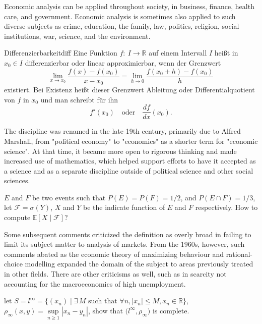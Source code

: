 \documentclass[titlestyle=hang,11pt]{elegantbook}
\begin{document}
Economic analysis can be applied throughout society, in business, finance, health care, and government. Economic analysis is sometimes also applied to such diverse subjects as crime, education, the family, law, politics, religion, social institutions, war, science, and the environment.

\begin{definition}{Differenzierbarkeit}{diff}
Eine Funktion $f:~I\to\mathbb{R}$ auf einem Intervall $I$ hei\ss{}t in $x_0\in I$ differenzierbar oder linear approximierbar, wenn der Grenzwert
   \begin{equation*}
      \lim\limits_{x\to x_0}\frac{f(x)-f(x_0)}{x-x_0}=
      \lim\limits_{h\to 0}\frac{f(x_0+h)-f(x_0)}{h}
   \end{equation*}
existiert. Bei Existenz hei\ss{}t dieser Grenzwert Ableitung oder Differentialquotient von $f$ in $x_0$ und man schreibt f\"{u}r ihn
   \begin{equation*}
      f'(x_0)\quad\text{oder}\quad\frac{df}{dx}(x_0).
   \end{equation*}
\end{definition}

The discipline was renamed in the late 19th century, primarily due to Alfred Marshall, from "political economy" to "economics" as a shorter term for "economic science". At that time, it became more open to rigorous thinking and made increased use of mathematics, which helped support efforts to have it accepted as a science and as a separate discipline outside of political science and other social sciences.

\begin{example}
$E$ and $F$ be two events such that $P(E)=
P(F)=1/2$, and $P(E\cap F)=1/3$, let $\mathscr{F}=\sigma(Y)$,  $X$ and $Y$ be the indicate function of $E$ and $F$ respectively. How to compute $\mathbb{E}[ X\mid \mathscr{F} ]$?
\end{example}

Some subsequent comments criticized the definition as overly broad in failing to limit its subject matter to analysis of markets. From the 1960s, however, such comments abated as the economic theory of maximizing behaviour and rational-choice modelling expanded the domain of the subject to areas previously treated in other fields. There are other criticisms as well, such as in scarcity not accounting for the macroeconomics of high unemployment.

\begin{exercise}
let $S=l^\infty=\big\{(x_n)\mid \exists\, M \text{ such that } \forall n, |x_n|\leq M,x_n\in \mathbb{R}\big\}$, $\rho_{\infty}(x,y)=\sup\limits_{n\geq 1}|x_n-y_n|$, show that $\big(l^\infty,\rho_{\infty}\big)$ is complete.
\end{exercise}
\end{document}
